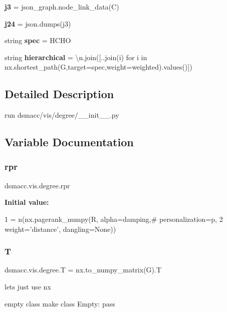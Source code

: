 \begin{DoxyCompactItemize}
{\bfseries j3} = json\+\_\+graph.\+node\+\_\+link\+\_\+data(C)
\item 
\mbox{\label{namespacedsmacc_1_1vis_1_1degree_a331480b6e17e61d4a8ced0841d93f15d}} 
{\bfseries j24} = json.\+dumps(j3)
\item 
\mbox{\label{namespacedsmacc_1_1vis_1_1degree_a31306b4029f579342e262ea04ac7a990}} 
string {\bfseries spec} = \textquotesingle{}H\+C\+HO\textquotesingle{}
\item 
\mbox{\label{namespacedsmacc_1_1vis_1_1degree_ab44347f8ff8675c95287f392f954155f}} 
string {\bfseries hierarchical} = \textquotesingle{}\textbackslash{}n\textquotesingle{}.join(\mbox{[}\textquotesingle{}.\textquotesingle{}.join(i) for i in nx.\+shortest\+\_\+path(G,target=spec,weight=\textquotesingle{}weighted\textquotesingle{}).values()\mbox{]})
\end{DoxyCompactItemize}


\subsection{Detailed Description}
\begin{DoxyVerb}run dsmacc/vis/degree/__init__.py\end{DoxyVerb}
 

\subsection{Variable Documentation}
\mbox{\label{namespacedsmacc_1_1vis_1_1degree_a8af259ed8c18d5050d081109f40ae153}} 
\subsubsection{\texorpdfstring{rpr}{rpr}}
{\footnotesize\ttfamily dsmacc.\+vis.\+degree.\+rpr}

{\bfseries Initial value\+:}
\begin{DoxyCode}
1 =  n(nx.pagerank\_numpy(R, alpha=damping,\textcolor{comment}{# personalization=p,}
2  weight=\textcolor{stringliteral}{'distance'}, dangling=\textcolor{keywordtype}{None}))
\end{DoxyCode}
\mbox{\label{namespacedsmacc_1_1vis_1_1degree_adbb4d4199b32ac300a4805757fd0e02b}} 
\subsubsection{\texorpdfstring{T}{T}}
{\footnotesize\ttfamily dsmacc.\+vis.\+degree.\+T = nx.\+to\+\_\+numpy\+\_\+matrix(G).T}



lets just use nx 

empty class make class Empty\+: pass 